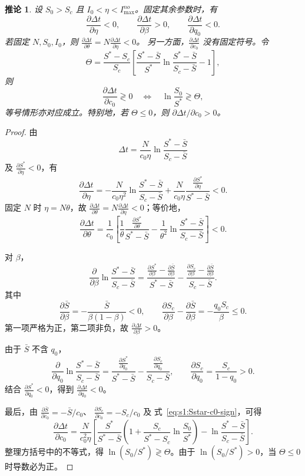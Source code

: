 \documentclass[lang=cn,a4paper,newtx]{elegantpaper}
\numberwithin{equation}{section}
\theoremstyle{plain}
\newtheorem{corollaryn}[theorem]{推论}
\begin{document}
\begin{corollaryn}
\label{cor:s1:duration-sensitivity}
设 $S_0>S_c$ 且 $I_0<\eta<I_{\max}^{no}$。固定其余参数时，有
\[
\frac{\partial \Delta t}{\partial \eta}<0,
\qquad
\frac{\partial \Delta t}{\partial \beta}>0,
\qquad
\frac{\partial \Delta t}{\partial q_0}<0.
\]
若固定 $N,S_0,I_0$，则
$\frac{\partial \Delta t}{\partial \theta}=N\frac{\partial \Delta t}{\partial \eta}<0$。
另一方面，$\frac{\partial \Delta t}{\partial c_0}$ 没有固定符号。令
\[
\Theta
=
\frac{S^*-S_c}{S_c}
\left[
\frac{S^*-\bar S}{S^*}
\ln\frac{S^*-\bar S}{S_c-\bar S}
-1
\right],
\]
则
\[
\frac{\partial\Delta t}{\partial c_0}
\gtrless0
\quad\Longleftrightarrow\quad
\ln\frac{S_0}{S^*}
\gtrless\Theta,
\]
等号情形亦对应成立。特别地，若 $\Theta\le0$，则
$\partial\Delta t/\partial c_0>0$。
\end{corollaryn}

\begin{proof}
由
\[
\Delta t
=
\frac{N}{c_0\eta}
\ln\frac{S^*-\bar S}{S_c-\bar S}
\]
及 $\frac{\partial S^*}{\partial \eta}<0$，有
\[
\frac{\partial\Delta t}{\partial\eta}
=
-\frac{N}{c_0\eta^2}
\ln\frac{S^*-\bar S}{S_c-\bar S}
+
\frac{N}{c_0\eta}
\frac{\frac{\partial S^*}{\partial \eta}}{S^*-\bar S}
<0.
\]
固定 $N$ 时 $\eta=N\theta$，故
$\frac{\partial \Delta t}{\partial \theta}=N\frac{\partial \Delta t}{\partial \eta}<0$；等价地，
\[
\frac{\partial\Delta t}{\partial\theta}
=
\frac1{c_0}
\left[
\frac1{\theta}
\frac{\frac{\partial S^*}{\partial \theta}}{S^*-\bar S}
-
\frac1{\theta^2}
\ln\frac{S^*-\bar S}{S_c-\bar S}
\right]<0.
\]

对 $\beta$，
\[
\frac{\partial}{\partial\beta}
\ln\frac{S^*-\bar S}{S_c-\bar S}
=
\frac{\frac{\partial S^*}{\partial \beta}-\frac{\partial \bar S}{\partial \beta}}{S^*-\bar S}
-
\frac{\frac{\partial S_c}{\partial \beta}-\frac{\partial \bar S}{\partial \beta}}{S_c-\bar S}.
\]
其中
\[
\frac{\partial \bar S}{\partial \beta}
=
-\frac{\bar S}{\beta(1-\beta)}<0,
\qquad
\frac{\partial S_c}{\partial \beta}-\frac{\partial \bar S}{\partial \beta}
=
-\frac{q_0S_c}{\beta}\le0.
\]
第一项严格为正，第二项非负，故 $\frac{\partial \Delta t}{\partial \beta}>0$。

由于 $\bar S$ 不含 $q_0$，
\[
\frac{\partial}{\partial q_0}
\ln\frac{S^*-\bar S}{S_c-\bar S}
=
\frac{\frac{\partial S^*}{\partial q_0}}{S^*-\bar S}
-
\frac{\frac{\partial S_c}{\partial q_0}}{S_c-\bar S},
\qquad
\frac{\partial S_c}{\partial q_0}
=
\frac{S_c}{1-q_0}>0.
\]
结合 $\frac{\partial S^*}{\partial q_0}<0$，得到 $\frac{\partial \Delta t}{\partial q_0}<0$。

最后，由
$\frac{\partial \bar S}{\partial c_0}=-\bar S/c_0$、
$\frac{\partial S_c}{\partial c_0}=-S_c/c_0$ 及
式~\eqref{eq:s1:Sstar-c0-sign}，可得
\[
\frac{\partial\Delta t}{\partial c_0}
=
\frac{N}{c_0^2\eta}
\left[
\frac{S^*}{S^*-\bar S}
\left(
1+
\frac{S_c}{S^*-S_c}
\ln\frac{S_0}{S^*}
\right)
-
\ln\frac{S^*-\bar S}{S_c-\bar S}
\right].
\]
整理方括号中的不等式，得
$\ln(S_0/S^*)\gtrless\Theta$。由于
$\ln(S_0/S^*)>0$，当 $\Theta\le0$ 时导数必为正。
\end{proof}
\end{document}
